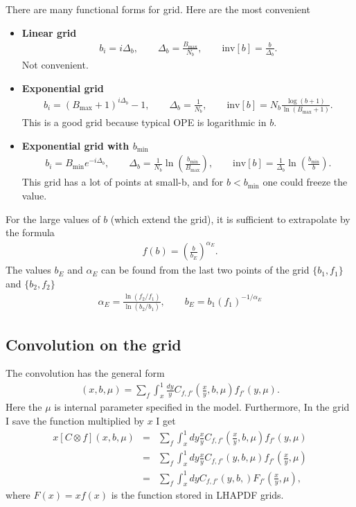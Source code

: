 \documentclass[prd,nofootinbib,eqsecnum,final]{revtex4}
\newcommand{\nn}{\nonumber}
\renewcommand{\(}{\left(}
\renewcommand{\)}{\right)}
\renewcommand{\[}{\left[}
\renewcommand{\]}{\right]}
\begin{document}
There are many functional forms for grid. Here are the most convenient
\begin{itemize}
\item \textbf{Linear grid} 
\begin{eqnarray}
b_i=i\Delta_b,\qquad \Delta_b=\frac{B_{\text{max}}}{N_b},\qquad \text{inv}[b]=\frac{b}{\Delta_b}.
\end{eqnarray}
Not convenient.
\item \textbf{Exponential grid} 
\begin{eqnarray}
b_i=(B_{\text{max}}+1)^{i \Delta_b}-1,\qquad \Delta_b=\frac{1}{N_b},\qquad \text{inv}[b]=N_b\frac{\log(b+1)}{\ln(B_\text{max}+1)}.
\end{eqnarray}
This is a good grid because typical OPE is logarithmic in $b$.

\item \textbf{Exponential grid with $b_{\text{min}}$} 
\begin{eqnarray}
b_i=B_{\text{min}} e^{-i \Delta_b},\qquad \Delta_b=\frac{1}{N_b}\ln\(\frac{b_{\text{min}}}{B_{\text{max}}}\),\qquad \text{inv}[b]=\frac{1}{\Delta_b}\ln\(\frac{b_{\text{min}}}{b}\).
\end{eqnarray}
This grid has a lot of points at small-b, and for $b<b_\text{min}$ one could freeze the value.
\end{itemize}

For the large values of $b$ (which extend the grid), it is sufficient to extrapolate by the formula
\begin{eqnarray}
f(b)=\(\frac{b}{b_E}\)^{\alpha_E}.
\end{eqnarray}
The values $b_E$ and $\alpha_E$ can be found from the last two points of the grid $\{b_1,f_1\}$ and $\{b_2,f_2\}$
\begin{eqnarray}
\alpha_E=\frac{\ln(f_2/f_1)}{\ln(b_2/b_1)},\qquad b_E=b_1 (f_1)^{-1/\alpha_E}
\end{eqnarray}

\subsection{Convolution on the grid}


The convolution has the general form
\begin{eqnarray}
[C\otimes f](x,b,\mu)=\sum_f\int_x^1 \frac{dy}{y} C_{f,f'}\(\frac{x}{y},b,\mu\)f_{f'}(y,\mu).
\end{eqnarray}
Here the $\mu$ is internal parameter specified in the model. Furthermore, In the grid I save the function multiplied by $x$ I get
\begin{eqnarray}
x[C\otimes f](x,b,\mu)&=&
\sum_f\int_x^1 dy\frac{x}{y} C_{f,f'}\(\frac{x}{y},b,\mu\)f_{f'}(y,\mu)
\\\nn
&=&
\sum_f\int_x^1 dy\frac{x}{y} C_{f,f'}(y,b,\mu)f_{f'}\(\frac{x}{y},\mu\)
\\\nn
&=&
\sum_f\int_x^1 dy C_{f,f'}(y,b,)F_{f'}\(\frac{x}{y},\mu\),
\end{eqnarray}
where $F(x)=xf(x)$ is the function stored in LHAPDF grids.
\end{document}

